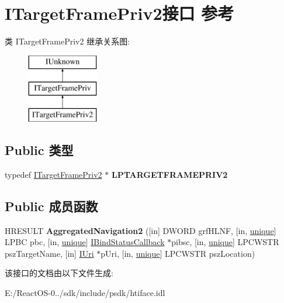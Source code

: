 \hypertarget{interface_i_target_frame_priv2}{}\section{I\+Target\+Frame\+Priv2接口 参考}
\label{interface_i_target_frame_priv2}
类 I\+Target\+Frame\+Priv2 继承关系图\+:\begin{figure}[H]
\begin{center}
\leavevmode
\includegraphics[height=3.000000cm]{interface_i_target_frame_priv2}
\end{center}
\end{figure}
\subsection*{Public 类型}
\begin{DoxyCompactItemize}
\item 
\mbox{\label{interface_i_target_frame_priv2_adc09910355f9d1109c0a175acf1cf127}} 
typedef \hyperlink{interface_i_target_frame_priv2}{I\+Target\+Frame\+Priv2} $\ast$ {\bfseries L\+P\+T\+A\+R\+G\+E\+T\+F\+R\+A\+M\+E\+P\+R\+I\+V2}
\end{DoxyCompactItemize}
\subsection*{Public 成员函数}
\begin{DoxyCompactItemize}
\item 
\mbox{\label{interface_i_target_frame_priv2_a1582352dae91803a8d84a481fb4965db}} 
H\+R\+E\+S\+U\+LT {\bfseries Aggregated\+Navigation2} (\mbox{[}in\mbox{]} D\+W\+O\+RD grf\+H\+L\+NF, \mbox{[}in, \hyperlink{interfaceunique}{unique}\mbox{]} L\+P\+BC pbc, \mbox{[}in, \hyperlink{interfaceunique}{unique}\mbox{]} \hyperlink{interface_i_bind_status_callback}{I\+Bind\+Status\+Callback} $\ast$pibsc, \mbox{[}in, \hyperlink{interfaceunique}{unique}\mbox{]} L\+P\+C\+W\+S\+TR psz\+Target\+Name, \mbox{[}in\mbox{]} \hyperlink{interface_i_uri}{I\+Uri} $\ast$p\+Uri, \mbox{[}in, \hyperlink{interfaceunique}{unique}\mbox{]} L\+P\+C\+W\+S\+TR psz\+Location)
\end{DoxyCompactItemize}


该接口的文档由以下文件生成\+:\begin{DoxyCompactItemize}
\item 
E\+:/\+React\+O\+S-\/0../sdk/include/psdk/htiface.\+idl\end{DoxyCompactItemize}
